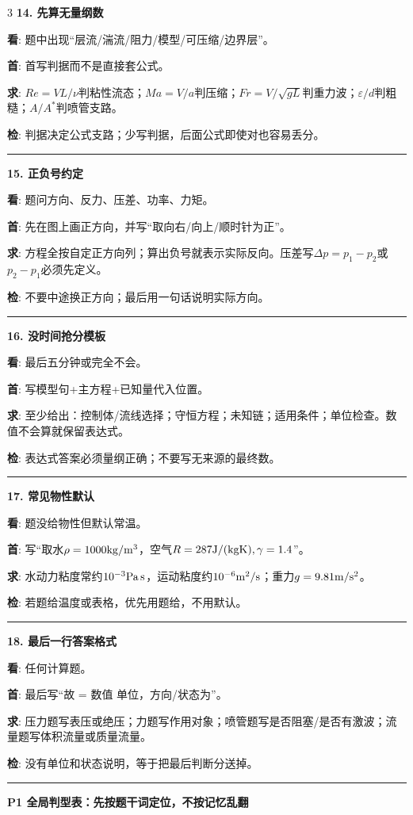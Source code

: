 \documentclass[UTF8,a4paper]{ctexart}
\newcommand{\lab}[1]{\textbf{\textcolor{B}{#1}}}
\newcommand{\blk}[5]{\textbf{\textcolor{B}{#1}}\par
\lab{看}: #2\par
\lab{首}: #3\par
\lab{求}: #4\par
\lab{检}: #5\par\vspace{1pt}\hrule\vspace{1.2pt}}
\newcommand{\ftitle}[1]{\vspace{1pt}\textbf{\textcolor{B}{#1}}\par\vspace{0.5pt}}
\begin{document}
\begin{multicols}{3}
\blk{14. 先算无量纲数}
{题中出现“层流/湍流/阻力/模型/可压缩/边界层”。}
{首写判据而不是直接套公式。}
{$Re=VL/\nu$判粘性流态；$Ma=V/a$判压缩；$Fr=V/\sqrt{gL}$判重力波；$\varepsilon/d$判粗糙；$A/A^*$判喷管支路。}
{判据决定公式支路；少写判据，后面公式即使对也容易丢分。}

\blk{15. 正负号约定}
{题问方向、反力、压差、功率、力矩。}
{先在图上画正方向，并写“取向右/向上/顺时针为正”。}
{方程全按自定正方向列；算出负号就表示实际反向。压差写$\Delta p=p_1-p_2$或$p_2-p_1$必须先定义。}
{不要中途换正方向；最后用一句话说明实际方向。}

\blk{16. 没时间抢分模板}
{最后五分钟或完全不会。}
{写模型句+主方程+已知量代入位置。}
{至少给出：控制体/流线选择；守恒方程；未知链；适用条件；单位检查。数值不会算就保留表达式。}
{表达式答案必须量纲正确；不要写无来源的最终数。}

\blk{17. 常见物性默认}
{题没给物性但默认常温。}
{写“取水$\rho=1000{\rm kg/m^3}$，空气$R=287{\rm J/(kgK)},\gamma=1.4$”。}
{水动力粘度常约$10^{-3}{\rm Pa\,s}$，运动粘度约$10^{-6}{\rm m^2/s}$；重力$g=9.81{\rm m/s^2}$。}
{若题给温度或表格，优先用题给，不用默认。}

\blk{18. 最后一行答案格式}
{任何计算题。}
{最后写“故 \underline{\hspace{0.8cm}} = 数值 单位，方向/状态为\underline{\hspace{0.8cm}}”。}
{压力题写表压或绝压；力题写作用对象；喷管题写是否阻塞/是否有激波；流量题写体积流量或质量流量。}
{没有单位和状态说明，等于把最后判断分送掉。}

\end{multicols}
\ftitle{P1 全局判型表：先按题干词定位，不按记忆乱翻}
\end{document}
